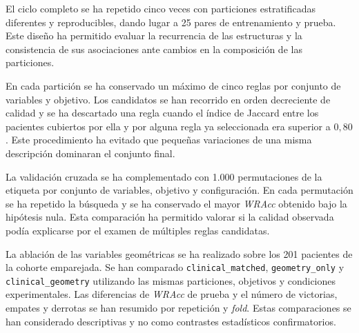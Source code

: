 El ciclo completo se ha repetido cinco veces con particiones estratificadas diferentes y reproducibles, dando lugar a 25 pares de entrenamiento y prueba. Este diseño ha permitido evaluar la recurrencia de las estructuras y la consistencia de sus asociaciones ante cambios en la composición de las particiones.

En cada partición se ha conservado un máximo de cinco reglas por conjunto de variables y objetivo. Los candidatos se han recorrido en orden decreciente de calidad y se ha descartado una regla cuando el índice de Jaccard entre los pacientes cubiertos por ella y por alguna regla ya seleccionada era superior a \(0{,}80\). Este procedimiento ha evitado que pequeñas variaciones de una misma descripción dominaran el conjunto final.

La validación cruzada se ha complementado con 1.000 permutaciones de la etiqueta por conjunto de variables, objetivo y configuración. En cada permutación se ha repetido la búsqueda y se ha conservado el mayor \textit{WRAcc} obtenido bajo la hipótesis nula. Esta comparación ha permitido valorar si la calidad observada podía explicarse por el examen de múltiples reglas candidatas.

La ablación de las variables geométricas se ha realizado sobre los 201 pacientes de la cohorte emparejada. Se han comparado \texttt{clinical\_matched}, \texttt{geometry\_only} y \texttt{clinical\_geometry} utilizando las mismas particiones, objetivos y condiciones experimentales. Las diferencias de \textit{WRAcc} de prueba y el número de victorias, empates y derrotas se han resumido por repetición y \textit{fold}. Estas comparaciones se han considerado descriptivas y no como contrastes estadísticos confirmatorios.





